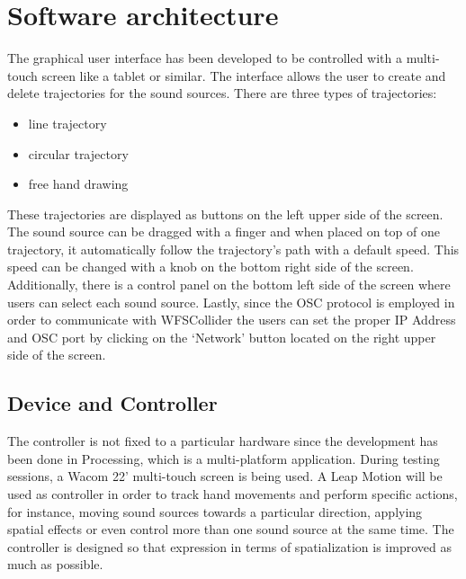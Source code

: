 \documentclass[journal]{IEEEtran}
\begin{document}
\section{Software architecture}
The graphical user interface has been developed to be controlled with a multi-touch screen like a tablet or similar. The interface allows the user to create and delete trajectories for the sound sources. There are three types of trajectories: 
\begin{itemize}
    \item line trajectory
    \item circular trajectory
    \item free hand drawing
\end{itemize}
These trajectories are displayed as buttons on the left upper side of the screen. The sound source can be dragged with a finger and when placed on top of one trajectory, it automatically follow the trajectory's path with a default speed. This speed can be changed with a knob on the bottom right side of the screen. Additionally, there is a control panel on the bottom left side of the screen where users can select each sound source. Lastly, since the OSC protocol is employed in order to communicate with WFSCollider the users can set the proper IP Address and OSC port by clicking on the `Network' button located on the right upper side of the screen.

\subsection{Device and Controller}
The controller is not fixed to a particular hardware since the development has been done in Processing, which is a multi-platform application. During testing sessions, a Wacom 22' multi-touch screen is being used. A Leap Motion will be used as controller in order to track hand movements and perform specific actions, for instance, moving sound sources towards a particular direction, applying spatial effects or even control more than one sound source at the same time. The controller is designed so that expression in terms of spatialization is improved as much as possible.
\end{document}

